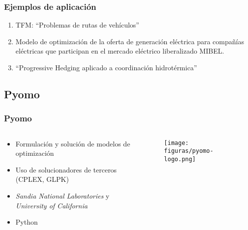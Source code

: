 \documentclass{beamer}
\begin{document}
\begin{frame}
    \frametitle{Ejemplos de aplicación}
    \begin{enumerate}
        \item TFM: ``Problemas de rutas de vehículos''
        \item Modelo de optimización de la oferta de generación eléctrica para compañías eléctricas que participan en el mercado eléctrico liberalizado MIBEL.
        \item ``Progressive Hedging aplicado a coordinación hidrotérmica''
    \end{enumerate}
\end{frame}

\subsection{Pyomo}

\begin{frame}
    \frametitle{Pyomo}
    \begin{columns}
        \begin{column}{5cm}
            \begin{itemize}
            \item Formulación y solución de modelos de optimización
            \item Uso de solucionadores de terceros (CPLEX, GLPK)
            \item \textit{Sandia National Laboratories} y \textit{University of California}
            \item Python
            \end{itemize}
        \end{column}
        \begin{column}{5cm}
            \begin{figure}[H]
                \centerline{\texttt{[image: figuras/pyomo-logo.png]}}
            \end{figure}
        \end{column}
    \end{columns}
\end{frame}
\end{document}
